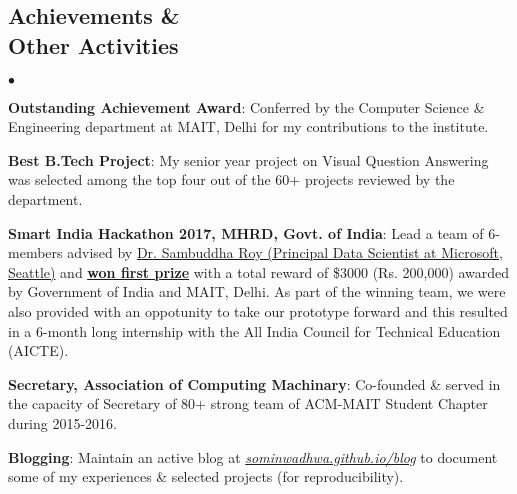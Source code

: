 \documentclass[margin,line]{res}
\newenvironment{list2}{
  \begin{list}{$\bullet$}{%
      \setlength{\itemsep}{0in}
      \setlength{\parsep}{0in} \setlength{\parskip}{0in}
      \setlength{\topsep}{0in} \setlength{\partopsep}{0in}
      \setlength{\leftmargin}{0.2in}}}{\end{list}}
\begin{document}
\begin{resume}
\section{\sc Achievements \& \\ Other Activities}
\begin{list2}
\item {\bf Outstanding Achievement Award}: Conferred by the Computer Science \& Engineering department at MAIT, Delhi for my contributions to the institute.
\item {\bf Best B.Tech Project}: My senior year project on Visual Question Answering was selected among the top four out of the 60+ projects reviewed by the department.
\item {\bf Smart India Hackathon 2017, MHRD, Govt. of India}: Lead a team of 6-members advised by {\href{https://www.linkedin.com/in/sambuddharoy/}{Dr. Sambuddha Roy (Principal Data Scientist at Microsoft, Seattle)}} and {\href{https://www.linkedin.com/feed/update/urn:li:activity:6255398180318470144}{\bf {\underline{won first prize}}}} with a total reward of \$3000 (Rs. 200,000) awarded by Government of India and MAIT, Delhi. As part of the winning team, we were also provided with an oppotunity to take our prototype forward and this resulted in a 6-month long internship with the All India Council for Technical Education (AICTE).
\item {\bf Secretary, Association of Computing Machinary}: Co-founded \& served in the capacity of Secretary of 80+ strong team of ACM-MAIT Student Chapter during 2015-2016.
\item {\bf Blogging}: Maintain an active blog at \textit{{\href{https://sominwadhwa.github.io/blog/}{sominwadhwa.github.io/blog}}} to document some of my experiences \& selected projects (for reproducibility).
\end{list2}

\end{resume}
\end{document}
